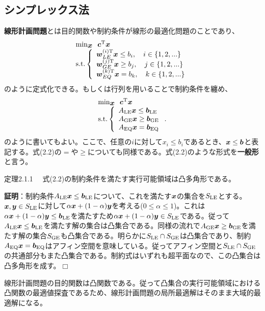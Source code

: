 \documentclass[dvipdfmx, 9pt, a4paper]{jsarticle}
\numberwithin{equation}{section}
\newcommand{\bm}[1]{{\mbox{\boldmath $#1$}}}
\def\qed{\hfill $\Box$}
\begin{document}
\subsection{シンプレックス法}
{\bf 線形計画問題}とは目的関数や制約条件が線形の最適化問題のことであり、
\begin{equation}
\begin{array}{l}
{\rm min}_{\bm x}~~\bm c^{\rm T}\bm x \\
{\rm s.t.}\left\{
\begin{array}{l}
\bm w_{LE}^{(i){\rm T}}\bm x \leq b_i,~~~i \in \{1, 2, ...\} \\
\bm w_{GE}^{(j){\rm T}}\bm x \geq b_j,~~~j \in \{1, 2, ...\} \\
\bm w_{EQ}^{(k){\rm T}}\bm x = b_k,~~~k \in \{1, 2, ...\} \\
\end{array}
\right.
\end{array}
\end{equation}
のように定式化できる。もしくは行列を用いることで制約条件を纏め、
\begin{equation}
\begin{array}{l}
{\rm min}_{\bm x}~~\bm c^{\rm T}\bm x \\
{\rm s.t.}\left\{
\begin{array}{l}
A_{\rm LE}\bm x \leq \bm b_{\rm LE} \\
A_{\rm GE}\bm x \geq \bm b_{\rm GE} \\
A_{\rm EQ}\bm x = \bm b_{\rm EQ} \\
\end{array}
\right. .
\end{array}
\end{equation}
のように書いてもよい。ここで、任意の$i$に対して$x_i \leq b_i$であるとき、$\bm x \leq \bm b$と表記する。式(2.2)の$=$や$\geq$についても同様である。式(2.2)のような形式を{\bf 一般形}と言う。
\begin{itembox}[l]{定理2.1.1}
　式(2.2)の制約条件を満たす実行可能領域は凸多角形である。
\end{itembox}
{\bf 証明}：制約条件$A_{\rm LE}\bm x \leq \bm b_{\rm LE}$について、これを満たす$\bm x$の集合を$S_{\rm LE}$とする。$\bm x, \bm y \in S_{\rm LE}$に対して$\alpha \bm x+(1-\alpha)\bm y$を考える($0\leq \alpha \leq 1$)。これは$\alpha\bm x + (1-\alpha) \bm y \leq \bm b_{\rm LE}$を満たすため$\alpha\bm x + (1-\alpha) \bm y \in S_{\rm LE}$である。従って$A_{\rm LE}\bm x \leq \bm b_{\rm LE}$を満たす解の集合は凸集合である。同様の流れで$A_{\rm GE}\bm x \geq \bm b_{\rm GE}$を満たす解の集合$S_{\rm GE}$も凸集合である。明らかに$S_{\rm LE}\cap S_{\rm GE}$は凸集合であり、制約$A_{\rm EQ}\bm x=\bm b_{\rm EQ}$はアフィン空間を意味している。従ってアフィン空間と$S_{\rm LE}\cap S_{\rm GE}$の共通部分もまた凸集合である。制約式はいずれも超平面なので、この凸集合は凸多角形を成す。\qed \par
線形計画問題の目的関数は凸関数である。従って凸集合の実行可能領域における凸関数の最適値探査であるため、線形計画問題の局所最適解はそのまま大域的最適解になる。
\end{document}
